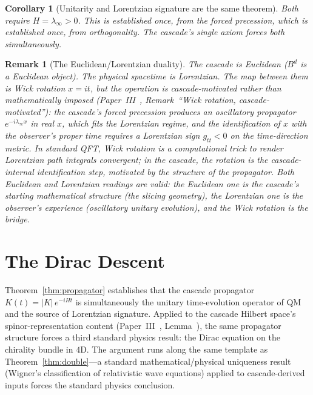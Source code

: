 \documentclass[12pt,a4paper]{article}
\newtheorem{corollary}[theorem]{Corollary}
\newtheorem*{remark}{Remark}
\begin{document}
\begin{corollary}[Unitarity and Lorentzian signature are the same theorem]
\label{cor:same}
Both require $H = \lambda_\infty > 0$. This is established once, from the
forced precession, which is established once, from orthogonality. The
cascade's single axiom forces both simultaneously.
\end{corollary}

\begin{remark}[The Euclidean/Lorentzian duality]
The cascade is Euclidean ($B^d$ is a Euclidean object). The physical
spacetime is Lorentzian. The map between them is Wick rotation
$x = it$, but the operation is \emph{cascade-motivated} rather than
\emph{mathematically imposed} (Paper~III~\cite{part3},
Remark~``Wick rotation, cascade-motivated''): the cascade's forced
precession produces an oscillatory propagator $e^{-i\lambda_\infty x}$ in
real $x$, which fits the Lorentzian regime, and the identification of
$x$ with the observer's proper time requires a Lorentzian sign
$g_{tt} < 0$ on the time-direction metric. In standard QFT, Wick
rotation is a computational trick to render Lorentzian path integrals
convergent; in the cascade, the rotation is the cascade-internal
identification step, motivated by the structure of the propagator.
Both Euclidean and Lorentzian readings are valid: the Euclidean one
is the cascade's starting mathematical structure (the slicing
geometry), the Lorentzian one is the observer's experience (oscillatory
unitary evolution), and the Wick rotation is the bridge.
\end{remark}

\section{The Dirac Descent}\label{sec:dirac-descent}

Theorem~\ref{thm:propagator} establishes that the cascade propagator
$K(t) = |K|\,e^{-iHt}$ is simultaneously the unitary time-evolution
operator of QM and the source of Lorentzian signature. Applied to the
cascade Hilbert space's spinor-representation content
(Paper~III~\cite{part3}, Lemma~), the
same propagator structure forces a third standard physics result: the
Dirac equation on the chirality bundle in $4$D. The argument runs
along the same template as Theorem~\ref{thm:double}---a standard
mathematical/physical uniqueness result (Wigner's classification of
relativistic wave equations) applied to cascade-derived inputs forces
the standard physics conclusion.
\end{document}
